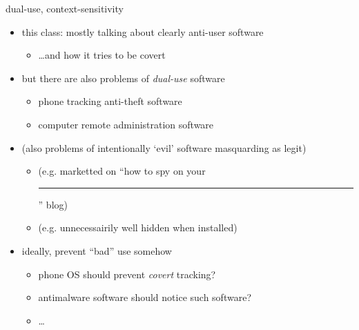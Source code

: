 
{
    \begin{frame}[plain]
    \end{frame}
}

\begin{frame}{dual-use, context-sensitivity}
    \begin{itemize}
    \item this class: mostly talking about clearly anti-user software
        \begin{itemize}
        \item \ldots and how it tries to be covert
        \end{itemize}
    \vspace{.5cm}
    \item but there are also problems of \textit{dual-use} software
        \begin{itemize}
        \item phone tracking anti-theft software
        \item computer remote administration software
        \end{itemize}
    \item (also problems of intentionally `evil' software masquarding as legit)
        \begin{itemize}
        \item (e.g. marketted on ``how to spy on your \rule{1cm}{.5pt}'' blog)
        \item (e.g. unnecessairily well hidden when installed)
        \end{itemize}
    \item ideally, prevent ``bad'' use somehow
        \begin{itemize}
        \item phone OS should prevent \textit{covert} tracking?
        \item antimalware software should notice such software?
        \item \ldots
        \end{itemize}
    \end{itemize}
\end{frame}
